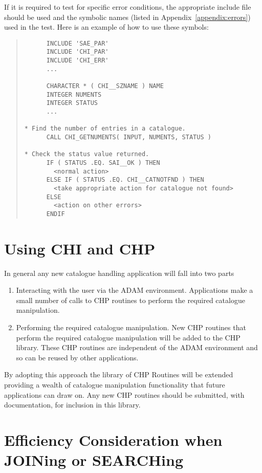 If it is required to test for specific error conditions, the appropriate
include file should be used and the symbolic names (listed in
Appendix~\ref{appendix:errors}) used in the test. Here is an example of how to
use these symbols: 

\begin{quote}
\begin{verbatim}
      INCLUDE 'SAE_PAR'
      INCLUDE 'CHI_PAR'
      INCLUDE 'CHI_ERR'
      ...

      CHARACTER * ( CHI__SZNAME ) NAME
      INTEGER NUMENTS
      INTEGER STATUS
      ...

* Find the number of entries in a catalogue.
      CALL CHI_GETNUMENTS( INPUT, NUMENTS, STATUS )

* Check the status value returned.
      IF ( STATUS .EQ. SAI__OK ) THEN
        <normal action>
      ELSE IF ( STATUS .EQ. CHI__CATNOTFND ) THEN
        <take appropriate action for catalogue not found>
      ELSE
        <action on other errors>
      ENDIF
\end{verbatim}
\end{quote}


\section {Using CHI and CHP}

In general any new catalogue handling application will fall into two parts 
\begin{enumerate}

 \item Interacting with the user via the ADAM environment. Applications make
a small number of calls to CHP routines to perform the required catalogue 
manipulation.

 \item Performing the required catalogue manipulation. New CHP routines that 
perform the required catalogue manipulation will be added to the CHP library.
These CHP routines are
independent of the ADAM environment 
and so can be reused by other applications.

\end{enumerate}

By adopting this approach the library of CHP Routines will be extended
providing a wealth of catalogue manipulation functionality that future 
applications can draw on. Any new CHP routines should be submitted, with 
documentation, for inclusion in this library.

\section{Efficiency Consideration when JOINing or SEARCHing}

